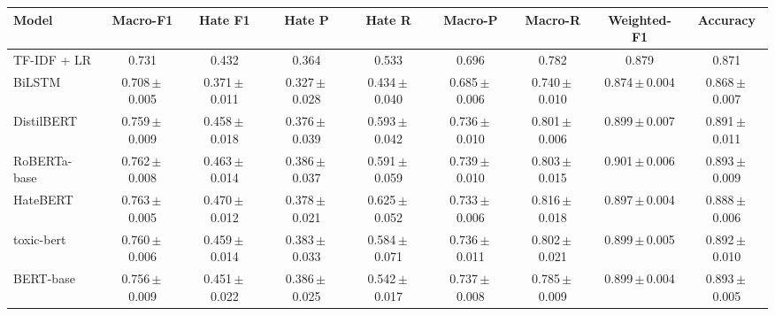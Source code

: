 \begin{tabular}{lcccccccc}
\toprule
Model & Macro-F1 & Hate F1 & Hate P & Hate R & Macro-P & Macro-R & Weighted-F1 & Accuracy \\
\midrule
TF-IDF + LR & 0.731 & 0.432 & 0.364 & 0.533 & 0.696 & 0.782 & 0.879 & 0.871 \\
BiLSTM & 0.708\,$\pm$\,0.005 & 0.371\,$\pm$\,0.011 & 0.327\,$\pm$\,0.028 & 0.434\,$\pm$\,0.040 & 0.685\,$\pm$\,0.006 & 0.740\,$\pm$\,0.010 & 0.874\,$\pm$\,0.004 & 0.868\,$\pm$\,0.007 \\
DistilBERT & 0.759\,$\pm$\,0.009 & 0.458\,$\pm$\,0.018 & 0.376\,$\pm$\,0.039 & 0.593\,$\pm$\,0.042 & 0.736\,$\pm$\,0.010 & 0.801\,$\pm$\,0.006 & 0.899\,$\pm$\,0.007 & 0.891\,$\pm$\,0.011 \\
RoBERTa-base & 0.762\,$\pm$\,0.008 & 0.463\,$\pm$\,0.014 & 0.386\,$\pm$\,0.037 & 0.591\,$\pm$\,0.059 & 0.739\,$\pm$\,0.010 & 0.803\,$\pm$\,0.015 & 0.901\,$\pm$\,0.006 & 0.893\,$\pm$\,0.009 \\
HateBERT & 0.763\,$\pm$\,0.005 & 0.470\,$\pm$\,0.012 & 0.378\,$\pm$\,0.021 & 0.625\,$\pm$\,0.052 & 0.733\,$\pm$\,0.006 & 0.816\,$\pm$\,0.018 & 0.897\,$\pm$\,0.004 & 0.888\,$\pm$\,0.006 \\
toxic-bert & 0.760\,$\pm$\,0.006 & 0.459\,$\pm$\,0.014 & 0.383\,$\pm$\,0.033 & 0.584\,$\pm$\,0.071 & 0.736\,$\pm$\,0.011 & 0.802\,$\pm$\,0.021 & 0.899\,$\pm$\,0.005 & 0.892\,$\pm$\,0.010 \\
BERT-base & 0.756\,$\pm$\,0.009 & 0.451\,$\pm$\,0.022 & 0.386\,$\pm$\,0.025 & 0.542\,$\pm$\,0.017 & 0.737\,$\pm$\,0.008 & 0.785\,$\pm$\,0.009 & 0.899\,$\pm$\,0.004 & 0.893\,$\pm$\,0.005 \\
\bottomrule
\end{tabular}
